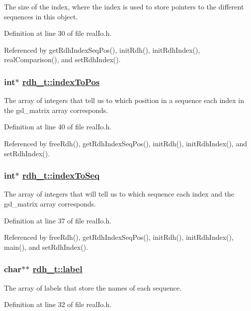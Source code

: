 The size of the index, where the index is used to store pointers to the different sequences in this object. 

Definition at line 30 of file real\-Io.h.

Referenced by get\-Rdh\-Index\-Seq\-Pos(), init\-Rdh(), init\-Rdh\-Index(), real\-Comparison(), and set\-Rdh\-Index().\hypertarget{structrdh__t_o5}{
\subsubsection[indexToPos]{\setlength{\rightskip}{0pt plus 5cm}int$\ast$ \hyperlink{structrdh__t_o5}{rdh\_\-t::index\-To\-Pos}}}
\label{structrdh__t_o5}


The array of integers that tell us to which position in a sequence each index in the gsl\_\-matrix array corresponds. 

Definition at line 40 of file real\-Io.h.

Referenced by free\-Rdh(), get\-Rdh\-Index\-Seq\-Pos(), init\-Rdh(), init\-Rdh\-Index(), and set\-Rdh\-Index().\hypertarget{structrdh__t_o4}{
\subsubsection[indexToSeq]{\setlength{\rightskip}{0pt plus 5cm}int$\ast$ \hyperlink{structrdh__t_o4}{rdh\_\-t::index\-To\-Seq}}}
\label{structrdh__t_o4}


The array of integers that will tell us to which sequence each index and the gsl\_\-matrix array corresponds. 

Definition at line 37 of file real\-Io.h.

Referenced by free\-Rdh(), get\-Rdh\-Index\-Seq\-Pos(), init\-Rdh(), init\-Rdh\-Index(), main(), and set\-Rdh\-Index().\hypertarget{structrdh__t_o2}{
\subsubsection[label]{\setlength{\rightskip}{0pt plus 5cm}char$\ast$$\ast$ \hyperlink{structrdh__t_o2}{rdh\_\-t::label}}}
\label{structrdh__t_o2}


The array of labels that store the names of each sequence. 

Definition at line 32 of file real\-Io.h.

